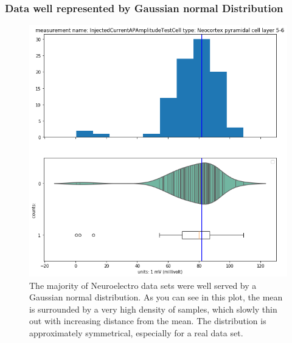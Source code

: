 \subsubsection{Data well represented by Gaussian normal Distribution}    

\begin{figure} 
    \begin{center}
   \includegraphics[scale=0.45]{figures/mean_well_served.png}
   \caption[Neuroelectro data set well served by normal distribution 1]{The majority of Neuroelectro data sets were well served by a Gaussian normal distribution. As you can see in this plot, the mean is surrounded by a very high density of samples, which slowly thin out with increasing distance from the mean. The distribution is approximately symmetrical, especially for a real data set. 
   }
    \end{center}
\end{figure}   


